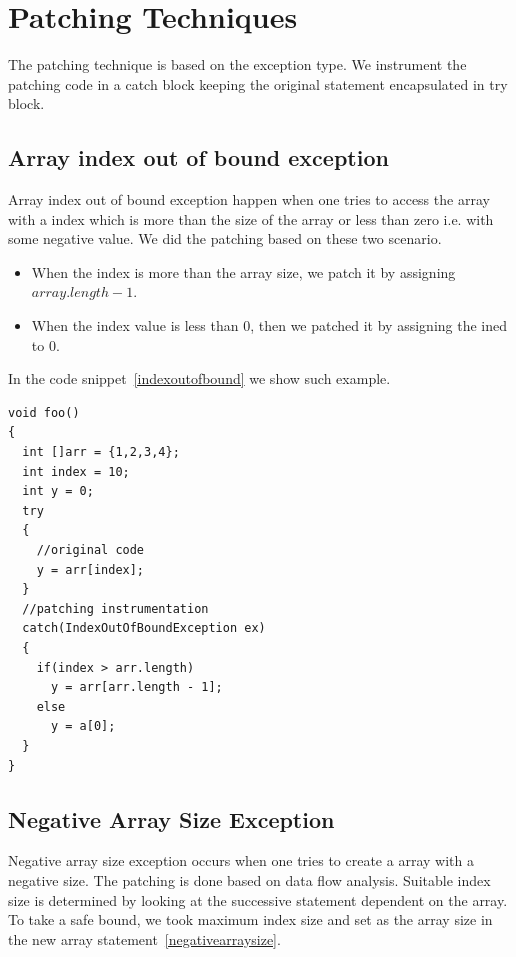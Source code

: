 \section{Patching Techniques}
\label{subsec:patchCA}

The patching technique is based on the exception type. We instrument the
patching code in a catch block keeping the original statement encapsulated in
try block.

\subsection{Array index out of bound exception}

Array index out of bound exception happen when one tries to access the array
with a index which is more than the size of the array or less than zero i.e.
with some negative value. We did the patching based on these two scenario.

\begin{itemize}
  \item When the index is more than the array size, we patch it by assigning
  $array.length - 1$.
  \item When the index value is less than $0$, then we patched it by assigning
  the ined to $0$.
\end{itemize}

In the code snippet~\ref{indexoutofbound} we show such example.


\onehalfspacing

\lstset{language=Java, caption=array index out of bound patching,
label=indexoutofbound}

\begin{lstlisting}
void foo()
{
  int []arr = {1,2,3,4};
  int index = 10;
  int y = 0;
  try
  {
    //original code
    y = arr[index];
  }
  //patching instrumentation
  catch(IndexOutOfBoundException ex)
  {
    if(index > arr.length)
      y = arr[arr.length - 1];
    else
      y = a[0];
  }
}

\end{lstlisting}

\doublespacing
\subsection{Negative Array Size Exception}

Negative array size exception occurs when one tries to create a array with a
negative size.
The patching is done based on data flow analysis. Suitable index size is
determined by looking at the successive statement dependent on the array.
To take a safe bound, we took maximum index size and set as the array size in
the new array statement~\ref{negativearraysize}.


